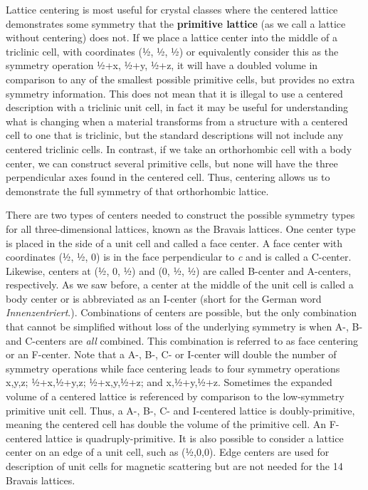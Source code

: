  Lattice centering is most useful for crystal classes where the centered lattice demonstrates some symmetry that the \textbf{primitive lattice} (as we call a lattice without centering) does not. If we place a lattice center into the middle of a triclinic cell, with coordinates (½, ½, ½) or equivalently consider this as the symmetry operation ½+x, ½+y, ½+z, it will have a doubled volume in comparison to any of the smallest possible primitive cells, but provides no extra symmetry information. This does not mean that it is illegal to use a centered description with a triclinic unit cell, in fact it may be useful for understanding what is changing when a material transforms from a structure with a centered cell to one that is triclinic, but the standard descriptions will not include any centered triclinic cells. In contrast, if we take an orthorhombic cell with a body center, we can construct several primitive cells, but none will have the three perpendicular axes found in the centered cell. Thus, centering allows us to demonstrate the full symmetry of that orthorhombic lattice. 

 There are two types of centers needed to construct the possible symmetry types for all three-dimensional lattices, known as the Bravais lattices. One center type is placed in the side of a unit cell and called a face center. A face center with coordinates (½, ½, 0) is in the face perpendicular to \textit{c} and is called a C-center. Likewise, centers at (½, 0, ½) and (0, ½, ½) are called B-center and A-centers, respectively. As we saw before, a center at the middle of the unit cell is called a body center or is abbreviated as an I-center (short for the German word \textit{Innenzentriert}.). Combinations of centers are possible, but the only combination that cannot be simplified without loss of the underlying symmetry is when A-, B- and C-centers are \textit{all} combined. This combination is referred to as face centering or an F-center. Note that a A-, B-, C- or I-center will double the number of symmetry operations while face centering leads to four symmetry operations x,y,z; ½+x,½+y,z; ½+x,y,½+z; and x,½+y,½+z. Sometimes the expanded volume of a centered lattice is referenced by comparison to the low-symmetry primitive unit cell. Thus, a A-, B-, C- and I-centered lattice is doubly-primitive, meaning the centered cell has double the volume of the primitive cell. An F-centered lattice is quadruply-primitive. It is also possible to consider a lattice center on an edge of a unit cell, such as (½,0,0). Edge centers are used for description of unit cells for magnetic scattering but are not needed for the 14 Bravais lattices. 

